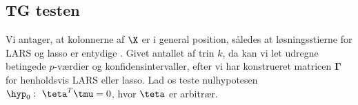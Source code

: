 
\subsection{TG testen}
Vi antager, at kolonnerne af \(\X\) er i general position, således at løsningsstierne for LARS og lasso er entydige \citep{lasso_unique}. 
Givet antallet af trin \(k\), da kan vi let udregne betingede \(p\)-værdier og konfidensintervaller, efter vi har konstrueret matricen \(\boldsymbol{\Gamma}\) for henholdsvis LARS eller lasso.
Lad os teste nulhypotesen \(\hyp_0: \ \teta^T \tmu = 0\), hvor \(\teta\) er arbitrær.

